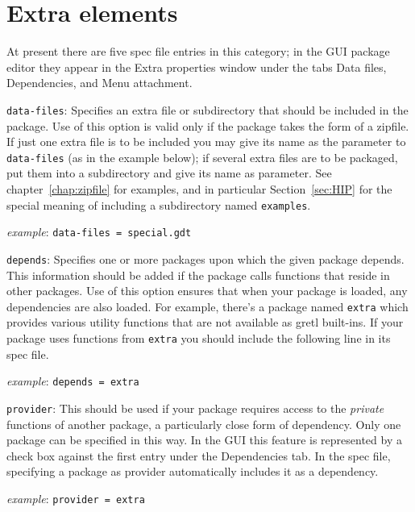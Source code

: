 \documentclass[oneside]{book}
\newcommand{\ttusage}[1]{\textit{example}: \quad \texttt{#1}}
\begin{document}
\section{Extra elements}
\label{sec:spec-extra}

At present there are five spec file entries in this category; in the
GUI package editor they appear in the \textsf{Extra properties} window
under the tabs \textsf{Data files}, \textsf{Dependencies}, and
\textsf{Menu attachment}.

\begin{description}

\item \texttt{data-files}: Specifies an extra file or subdirectory
  that should be included in the package. Use of this option is valid
  only if the package takes the form of a zipfile. If just one extra
  file is to be included you may give its name as the parameter to
  \texttt{data-files} (as in the example below); if several extra
  files are to be packaged, put them into a subdirectory and give its
  name as parameter. See chapter~\ref{chap:zipfile} for examples, and
  in particular Section~\ref{sec:HIP} for the special meaning of
  including a subdirectory named \texttt{examples}.

  \ttusage{data-files = special.gdt}

\item \texttt{depends}: Specifies one or more packages upon which the
  given package depends. This information should be added if the
  package calls functions that reside in other packages.  Use of this
  option ensures that when your package is loaded, any dependencies
  are also loaded.  For example, there's a package named
  \texttt{extra} which provides various utility functions that are not
  available as gretl built-ins.  If your package uses functions from
  \texttt{extra} you should include the following line in its spec
  file.

  \ttusage{depends = extra}

\item \texttt{provider}: This should be used if your package requires
  access to the \textit{private} functions of another package, a
  particularly close form of dependency. Only one package can be
  specified in this way.  In the GUI this feature is represented by a
  check box against the first entry under the \textsf{Dependencies}
  tab. In the spec file, specifying a package as provider
  automatically includes it as a dependency.

  \ttusage{provider = extra}


\end{description}
\end{document}
